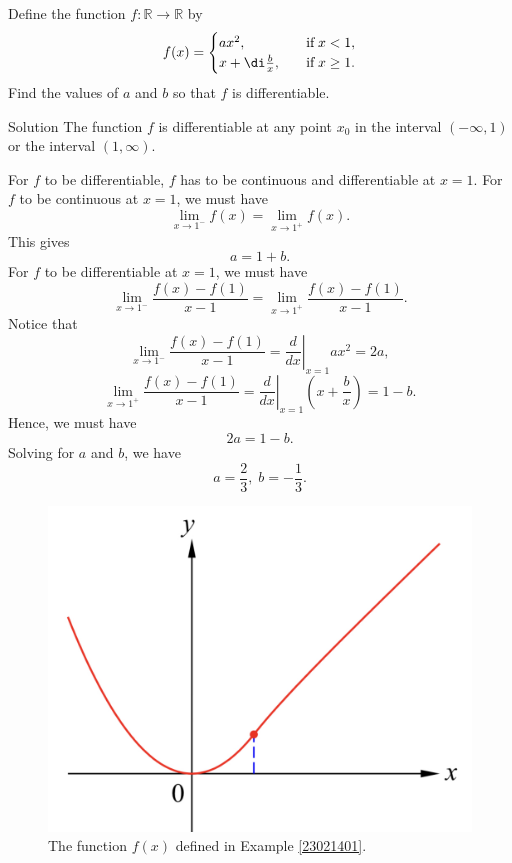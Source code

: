 \begin{example}[label=23021401]{}
Define the function $f:\mathbb{R}\to\mathbb{R}$ by
\[f(x)=\begin{cases} ax^2,\quad &\text{if}\;x< 1,\\
x+\di \frac{b}{x},\quad &\text{if}\; x\geq 1.\end{cases}
\]Find the values of $a$ and $b$ so that $f$ is differentiable.

\end{example}
\begin{solution}{Solution}
The function $f$ is differentiable at any point  $x_0$ in the interval $(-\infty, 1)$ or the interval $(1, \infty)$.

For $f$  to be  differentiable, $f$ has to be continuous and differentiable at $x=1$. For $f$ to be continuous at $x=1$, we must have
\[\lim_{x\rightarrow 1^-}f(x)=\lim_{x\rightarrow 1^+}f(x).\]
This gives
\[a=1+b.\]
For $f$ to be differentiable at $x=1$, we must have
\[\lim_{x\rightarrow 1^-}\frac{f(x)-f(1)}{x-1}=\lim_{x\rightarrow 1^+}\frac{f(x)-f(1)}{x-1}.\]
Notice that
\[\lim_{x\rightarrow 1^-}\frac{f(x)-f(1)}{x-1}=\left.\frac{d}{dx}\right|_{x=1}ax^2=2a,\]
\[\lim_{x\rightarrow 1^+}\frac{f(x)-f(1)}{x-1}=\left.\frac{d}{dx}\right|_{x=1}\left(x+\frac{b}{x}\right)=1-b.\]
Hence, we must have
\[2a=1-b.\]
Solving for $a$ and $b$, we have 
\[a= \frac{2}{3},\;b=-\frac{1}{3}.\]
\end{solution}

\vp
 \begin{figure}[ht]
\centering
\includegraphics[scale=0.2]{Picture21.png}
\caption{  The function $f(x)$ defined in Example \ref{23021401}. \fa}\label{figure21}
\end{figure}

